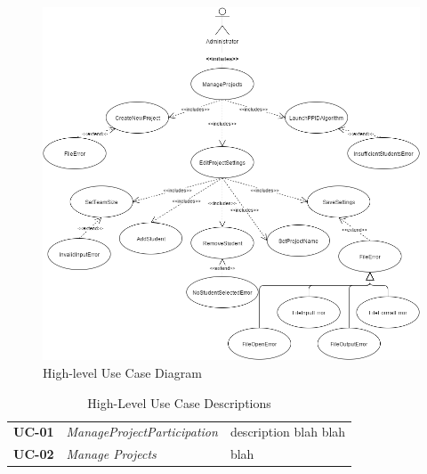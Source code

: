 \documentclass[12pt,letterpaper]{article}
\begin{document}
\begin{figure}[H]
	\centering{}
	\includegraphics[scale=0.5]{imgs/Administrator-Use-Case.png}
	\caption{High-level Use Case Diagram}
\end{figure}

\begin{table}[H]
\caption{High-Level Use Case Descriptions}
\renewcommand{\arraystretch}{1.5}
\everyrow{\hline}
\begin{tabu} to 
UC-01 & ManageProjectParticipation & description blah blah \\
UC-02 & Manage Projects & blah \\
\end{tabu}
\end{table}
\end{document}
